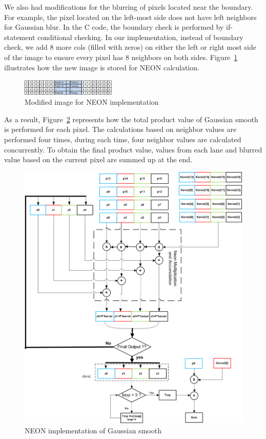 We also had modifications for the blurring of pixels located near the boundary. For example, the pixel located on the left-most side does not have left neighbors for Gaussian blur. In the C code, the boundary check is performed by if-statement conditional checking. In our implementation, instead of boundary check, we add 8 more cols (filled with zeros) on either the left or right most side of the image to ensure every pixel has 8 neighbors on both sides. Figure~\ref{fig:addcols} illustrates how the new image is stored for NEON calculation. 

\begin{figure}
\centering
\includegraphics[width=0.4\textwidth]{drawings/new_cols}
\caption{Modified image for NEON implementation}
\label{fig:addcols}
\end{figure}

As a result, Figure~\ref{fig:neon} represents how the total product value of Gaussian smooth is performed for each pixel. The calculations based on neighbor values are performed four times, during each time, four neighbor values are calculated concurrently. To obtain the final product value, values from each lane and blurred value based on the current pixel are summed up at the end.

\begin{figure}
\centering
\includegraphics[width=0.6\linewidth]{drawings/neon}
\caption{NEON implementation of Gaussian smooth}
\label{fig:neon}
\end{figure}
